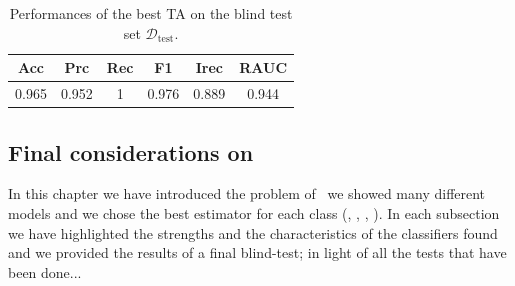 \begin{table}[!ht]
	\caption{Performances of the best TA on the blind test set $\mathscr
			D_\mathrm{test}$.}\label{tab:qrp-ta-test}

	\bigskip
	\setlength{\tabcolsep}{6pt}
	\centering
	\begin{tabular}{cccccc}
		\toprule
		\textbf{Acc} & \textbf{Prc} & \textbf{Rec} & \textbf{F1} & \textbf{Irec} & \textbf{RAUC} \\
		\midrule
		0.965        & 0.952        & 1            & 0.976       & 0.889         & 0.944         \\
		\bottomrule
	\end{tabular}
\end{table}


\subsection{Final considerations on \qrp}
In this chapter we have introduced the problem of \qrp\ we showed many different models and we
chose the best estimator for each class (\dt, \svc, \rf, \ta). In each subsection we have
highlighted the strengths and the characteristics of the classifiers found and we provided the
results of a final blind-test; in light of all the tests that have been done...








